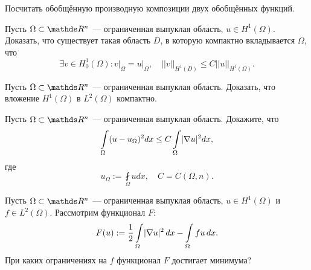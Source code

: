 \begin{exercise}
Посчитать обобщённую производную композиции двух обобщённых функций.
\end{exercise}

\begin{exercise}
Пусть $\Omega \subset \real^n$ --- ограниченная выпуклая область, $u \in H^1(\Omega)$. Доказать, что существует такая область $D$, в которую компактно вкладывается $\Omega$, что
$$\exists v \in H_0^1(\Omega): v\Big\rvert_{\Omega} = u\Big\rvert_{\Omega}, \quad || v ||_{H^1(D)} \leq C || u ||_{H^1(\Omega)}.$$
\end{exercise}

\begin{exercise}
Пусть $\Omega \subset \real^n$ --- ограниченная выпуклая область. Доказать, что вложение $H^1(\Omega)$ в $L^2 (\Omega)$ компактно.
\end{exercise}

\begin{exercise}
Пусть $\Omega \subset \real^n$ --- ограниченная выпуклая область. Докажите, что
$$ \int \limits_{\Omega} (u - u_{\Omega})^2 dx \leq C \int \limits_{\Omega} \lvert\nabla u\rvert^2 dx, $$
где
$$ u_{\Omega} := \fint \limits_{\Omega} u dx, \quad C = C(\Omega,n).$$
\end{exercise}

\begin{exercise}
Пусть $\Omega \subset \real^n$ --- ограниченная выпуклая область, $u \in H^1(\Omega)$ и $f \in L^2(\Omega)$. Рассмотрим функционал $F$:
$$ F(u) := \frac {1} {2} \int \limits_{\Omega} \lvert\nabla u\rvert^2 \, dx - \int \limits_{\Omega} fu \, dx.$$
При каких ограничениях на $f$ функционал $F$ достигает минимума? 
\end{exercise}